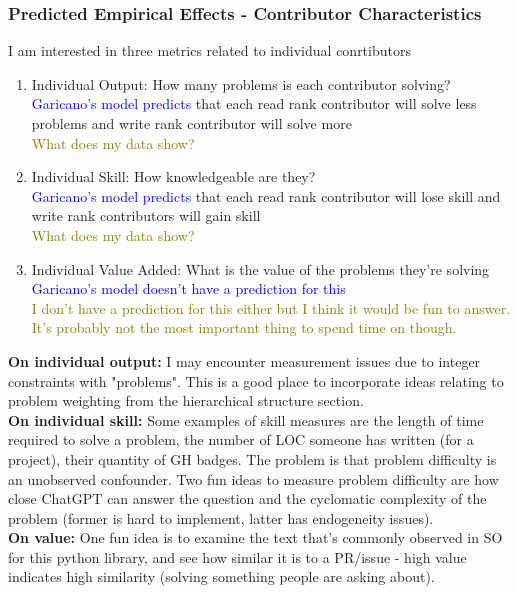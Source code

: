 \documentclass[source/paper/main.tex]{subfiles}
\begin{document}
\subsubsection{Predicted Empirical Effects - Contributor Characteristics}
I am interested in three metrics related to individual conrtibutors
\begin{enumerate}
    \item Individual Output: How many problems is each contributor solving?\\
    \textcolor{blue}{Garicano's model predicts } that each read rank contributor will solve less problems and write rank contributor will solve more\\
    \textcolor{olive}{What does my data show?}
    \item Individual Skill: How knowledgeable are they? \\
    \textcolor{blue}{Garicano's model predicts } that each read rank contributor will lose skill and write rank contributors will gain skill\\
    \textcolor{olive}{What does my data show?}
    \item Individual Value Added: What is the value of the problems they're solving
    \textcolor{blue}{Garicano's model doesn't have a prediction for this}\\
    \textcolor{olive}{I don't have a prediction for this either but I think it would be fun to answer. It's probably not the most important thing to spend time on though.}
\end{enumerate}
\textbf{On individual output:} I may encounter measurement issues due to integer constraints with "problems". This is a good place to incorporate ideas relating to problem weighting from the hierarchical structure section. \\
\textbf{On individual skill:} Some examples of skill measures are the length of time required to solve a problem, the number of LOC someone has written (for a project), their quantity of GH badges. The problem is that problem difficulty is an unobserved confounder. Two fun ideas to measure problem difficulty are how close ChatGPT can answer the question and the cyclomatic complexity of the problem (former is hard to implement, latter has endogeneity issues). \\
\textbf{On value: } One fun idea is to examine the text that's commonly observed in SO for this python library, and see how similar it is to a PR/issue - high value indicates high similarity (solving something people are asking about). 
\end{document}
